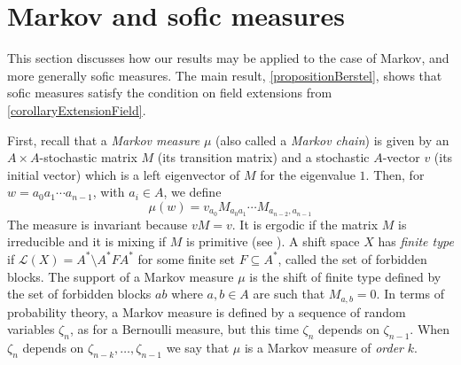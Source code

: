 \documentclass[a4paper,UKenglish,numberwithinsect,cleveref]{lipics-v2021}
\newcommand{\cL}{\mathcal L}
\begin{document}
\section{Markov and sofic measures}
\label{sec:markov}

This section discusses how our results may be applied to the case of Markov, and more generally sofic measures. The main result, \cref{propositionBerstel}, shows that sofic measures satisfy the condition on field extensions from \cref{corollaryExtensionField}.

First, recall that a \emph{Markov measure} $\mu$ (also called a \emph{Markov chain}) is given by an $A\times A$-stochastic matrix $M$ (its transition matrix) and a stochastic $A$-vector $v$ (its initial vector) which is a left eigenvector of $M$ for the eigenvalue $1$. Then, for $w=a_0a_1\cdots a_{n-1}$, with $a_i\in A$, we define
\[
    \mu(w)=v_{a_0}M_{a_0a_1}\cdots M_{a_{n-2},a_{n-1}}
\]
The measure is invariant because $vM=v$. It is ergodic if the matrix $M$ is irreducible and it is mixing if $M$ is primitive (see \cite{book/Petersen1983}). A shift space $X$ has \emph{finite type} if $\cL(X) = A^*\setminus A^*FA^*$ for some finite set $F\subseteq A^*$, called the set of forbidden blocks. The support of a Markov measure $\mu$ is the shift of finite type defined by the set of forbidden blocks $ab$ where $a,b\in A$ are such that $M_{a,b}=0$. In terms of probability theory, a Markov measure is defined by a sequence of random variables $\zeta_n$, as for a Bernoulli measure, but this time $\zeta_n$ depends on $\zeta_{n-1}$. When $\zeta_n$ depends on $\zeta_{n-k},\ldots,\zeta_{n-1}$ we say that $\mu$ is a Markov measure of \emph{order} $k$.
\end{document}

